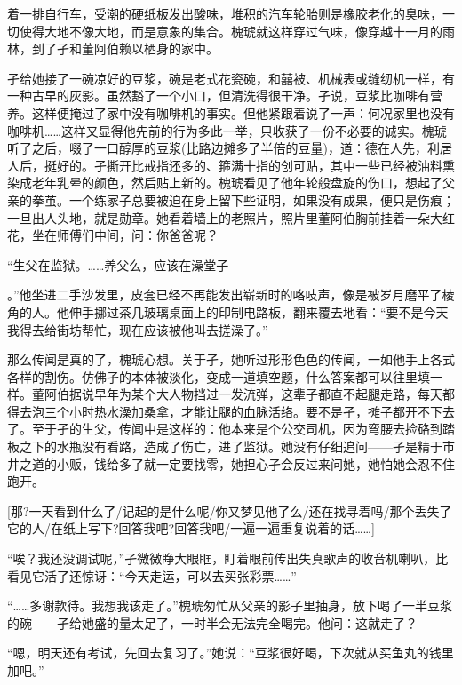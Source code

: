 \documentclass{article}
\begin{document}
\newpage 

着一排自行车，受潮的硬纸板发出酸味，堆积的汽车轮胎则是橡胶老化的臭味，一切使得大地不像大地，而是意象的集合。槐琥就这样穿过气味，像穿越十一月的雨林，到了孑和董阿伯赖以栖身的家中。

孑给她接了一碗凉好的豆浆，碗是老式花瓷碗，和囍被、机械表或缝纫机一样，有一种古早的灰影。虽然豁了一个小口，但清洗得很干净。孑说，豆浆比咖啡有营养。这样便掩过了家中没有咖啡机的事实。但他紧跟着说了一声：何况家里也没有咖啡机……这样又显得他先前的行为多此一举，只收获了一份不必要的诚实。槐琥听了之后，啜了一口醇厚的豆浆(比路边摊多了半倍的豆量)，道：德在人先，利居人后，挺好的。孑撕开比戒指还多的、箍满十指的创可贴，其中一些已经被油料熏染成老年乳晕的颜色，然后贴上新的。槐琥看见了他年轮般盘旋的伤口，想起了父亲的拳茧。一个练家子总要被迫在身上留下些证明，如果没有成果，便只是伤痕；一旦出人头地，就是勋章。她看着墙上的老照片，照片里董阿伯胸前挂着一朵大红花，坐在师傅们中间，问：你爸爸呢？

“生父在监狱。……养父么，应该在澡堂子

\newpage 

。”他坐进二手沙发里，皮套已经不再能发出崭新时的咯吱声，像是被岁月磨平了棱角的人。他伸手挪过茶几玻璃桌面上的印制电路板，翻来覆去地看：“要不是今天我得去给街坊帮忙，现在应该被他叫去搓澡了。”

那么传闻是真的了，槐琥心想。关于孑，她听过形形色色的传闻，一如他手上各式各样的割伤。仿佛孑的本体被淡化，变成一道填空题，什么答案都可以往里填一样。董阿伯据说早年为某个大人物挡过一发流弹，这辈子都直不起腿走路，每天都得去泡三个小时热水澡加桑拿，才能让腿的血脉活络。要不是孑，摊子都开不下去了。至于孑的生父，传闻中是这样的：他本来是个公交司机，因为弯腰去捡硌到踏板之下的水瓶没有看路，造成了伤亡，进了监狱。她没有仔细追问——孑是精于市井之道的小贩，钱给多了就一定要找零，她担心孑会反过来问她，她怕她会忍不住跑开。

[那?一天看到什么了/记起的是什么呢/你又梦见他了么/还在找寻着吗/那个丢失了它的人/在纸上写下?回答我吧?回答我吧/一遍一遍重复说着的话……]

\newpage 



“唉？我还没调试呢，”孑微微睁大眼眶，盯着眼前传出失真歌声的收音机喇叭，比看见它活了还惊讶：“今天走运，可以去买张彩票……”

“……多谢款待。我想我该走了。”槐琥匆忙从父亲的影子里抽身，放下喝了一半豆浆的碗——孑给她盛的量太足了，一时半会无法完全喝完。他问：这就走了？

“嗯，明天还有考试，先回去复习了。”她说：“豆浆很好喝，下次就从买鱼丸的钱里加吧。”
\end{document}
